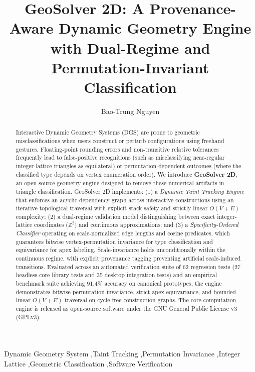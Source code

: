 \documentclass[preprint,12pt]{elsarticle}
\begin{document}
\begin{frontmatter}

\title{GeoSolver 2D: A Provenance-Aware Dynamic Geometry Engine with Dual-Regime and Permutation-Invariant Classification}

\author{Bao-Trung Nguyen}


\begin{abstract}
Interactive Dynamic Geometry Systems (DGS) are prone to geometric misclassifications when users construct or perturb configurations using freehand gestures. Floating-point rounding errors and non-transitive relative tolerances frequently lead to false-positive recognitions (such as misclassifying near-regular integer-lattice triangles as equilateral) or permutation-dependent outcomes (where the classified type depends on vertex enumeration order). We introduce \textbf{GeoSolver 2D}, an open-source geometry engine designed to remove these numerical artifacts in triangle classification. GeoSolver 2D implements: (1) a \textit{Dynamic Taint Tracking Engine} that enforces an acyclic dependency graph across interactive constructions using an iterative topological traversal with explicit stack safety and strictly linear $O(V+E)$ complexity; (2) a dual-regime validation model distinguishing between exact integer-lattice coordinates ($\mathbb{Z}^2$) and continuous approximations; and (3) a \textit{Specificity-Ordered Classifier} operating on scale-normalized edge lengths and cosine predicates, which guarantees bitwise vertex-permutation invariance for type classification and equivariance for apex labeling. Scale-invariance holds unconditionally within the continuous regime, with explicit provenance tagging preventing artificial scale-induced transitions. Evaluated across an automated verification suite of 62 regression tests (27 headless core library tests and 35 desktop integration tests) and an empirical benchmark suite achieving 91.4\% accuracy on canonical prototypes, the engine demonstrates bitwise permutation invariance, strict apex equivariance, and bounded linear $O(V+E)$ traversal on cycle-free construction graphs. The core computation engine is released as open-source software under the GNU General Public License v3 (GPLv3).
\end{abstract}

\begin{keyword}
Dynamic Geometry System \sep Taint Tracking \sep Permutation Invariance \sep Integer Lattice \sep Geometric Classification \sep Software Verification
\end{keyword}

\end{frontmatter}
\end{document}
